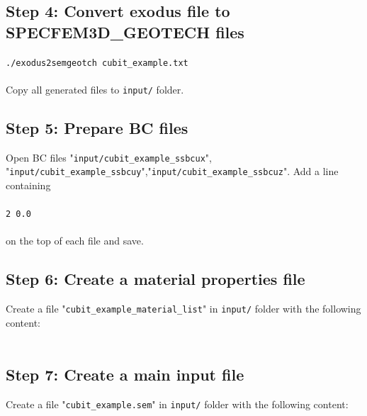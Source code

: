 \subsection*{Step 4: Convert exodus file to SPECFEM3D\_GEOTECH files}

\texttt{./exodus2semgeotch cubit\_example.txt}\\
\\
Copy all generated files to \texttt{input/} folder.

\subsection*{Step 5: Prepare BC files}

Open BC files "\texttt{input/cubit\_example\_ssbcux}", "\texttt{input/cubit\_example\_ssbcuy}",\newline "\texttt{input/cubit\_example\_ssbcuz}". Add a line containing\\
\\
\texttt{2 0.0}\\
\\
on the top of each file and save.

\subsection*{Step 6: Create a material properties file}

Create a file "\texttt{cubit\_example\_material\_list}" in \texttt{input/} folder with the following content:
\\
\\
\colorbox{gray}{
\parbox{16cm}{
}}

\subsection*{Step 7: Create a main input file}

Create a file "\texttt{cubit\_example.sem}" in \texttt{input/} folder with the following content:
\\

